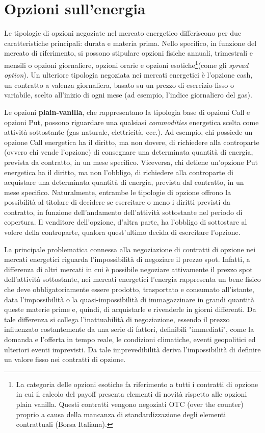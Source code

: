 \documentclass[12pt,a4paper]{report}
\begin{document}
\section{Opzioni sull'energia}


Le tipologie di opzioni negoziate nel mercato energetico differiscono per due caratteristiche principali: durata e materia prima. Nello specifico, in funzione del mercato di riferimento, si possono stipulare opzioni fisiche annuali, trimestrali e mensili o opzioni giornaliere, opzioni orarie e opzioni esotiche\footnote{La categoria delle opzioni esotiche fa riferimento a tutti i contratti di opzione in cui il calcolo del payoff presenta elementi di novità rispetto alle opzioni plain vanilla. Questi contratti vengono negoziati OTC (over the counter) proprio a causa della mancanza di standardizzazione degli elementi contrattuali (Borsa Italiana).}(come gli \textit{spread option}). Un ulteriore tipologia negoziata nei mercati energetici è l'opzione cash, un contratto a valenza giornaliera, basato su un prezzo di esercizio fisso o variabile, scelto all'inizio di ogni mese (ad esempio, l'indice giornaliero del gas).
 
 Le opzioni \textbf{plain-vanilla}, che rappresentano la tipologia base di opzioni Call e opzioni Put, possono riguardare una qualsiasi \textit{commodities} energetica scelta come attività sottostante (gas naturale, elettricità, ecc.). Ad esempio, chi possiede un opzione Call energetica ha il diritto, ma non dovere, di richiedere alla controparte (ovvero chi vende l'opzione) di consegnare una determinata quantità di energia, prevista da contratto, in un mese specifico. Viceversa, chi detiene un'opzione Put energetica ha il diritto, ma non l'obbligo, di richiedere alla controparte di acquistare una determinata quantità di energia, prevista dal contratto, in un mese specifico. Naturalmente, entrambe le tipologie di opzione offrono la possibilità al titolare di decidere se esercitare o meno i diritti previsti da contratto, in funzione dell'andamento dell'attività sottostante nel periodo di copertura. Il venditore dell'opzione, d'altra parte, ha l'obbligo di sottostare al volere della controparte, qualora quest'ultimo decida di esercitare l'opzione.  

La principale problematica connessa alla negoziazione di contratti di 
opzione nei mercati energetici riguarda l'impossibilità di negoziare il prezzo spot. Infatti, a differenza di altri mercati in cui è possibile negoziare attivamente il prezzo spot dell'attività sottostante, nei mercati energetici l'energia rappresenta un bene fisico che deve obbligatoriamente essere prodotto, trasportato e consumato all'istante, data l'impossibilità o la quasi-impossibilità di immagazzinare in grandi quantità queste materie prime e, quindi, di acquistarle e rivenderle in giorni differenti. Da tale differenza si collega l'inattuabilità di negoziazione, essendo il prezzo influenzato costantemente da una serie di fattori, definibili "immediati", come la domanda e l'offerta in tempo reale, le condizioni climatiche, eventi geopolitici ed ulteriori eventi imprevisti. Da tale imprevedibilità deriva l'impossibilità di definire un valore fisso nei contratti di opzione.
\end{document}
